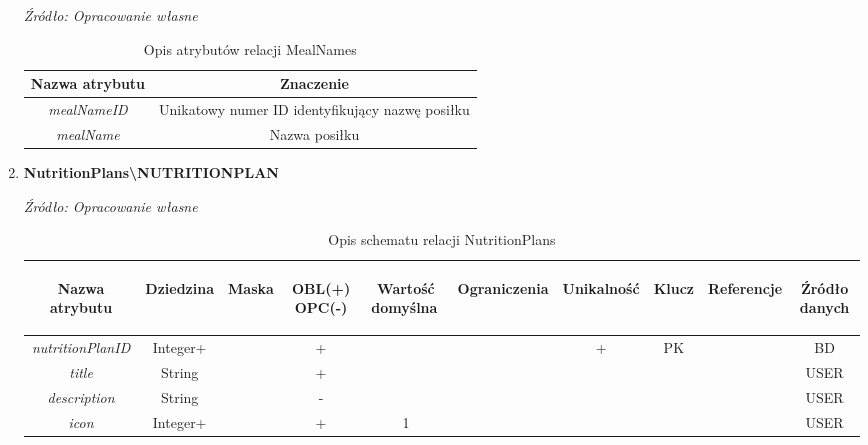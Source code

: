 \documentclass[12pt,twoside]{report}
\begin{document}
\begin{enumerate}[start=10,label={\bfseries REL\textbackslash\arabic*}]
	\begin{table}[H]
		\caption{Opis atrybutów relacji MealNames}
		\textit{Źródło: Opracowanie własne}
		\label{MealNamesAttributeDescription}
		\centering
		\begin{tabular}{|c|c|}
			\hline
			Nazwa atrybutu & Znaczenie \\			
			\hline			
			\textit{mealNameID}&Unikatowy numer ID identyfikujący nazwę posiłku\\	
			\hline			
			\textit{mealName}& Nazwa posiłku\\	
			\hline
		\end{tabular}
	\end{table}
	\item \textbf{NutritionPlans\textbackslash NUTRITIONPLAN} \begin{table}[H]
		\caption{Opis schematu relacji NutritionPlans}
		\textit{Źródło: Opracowanie własne}
		\label{NutritionPlansRelationSchema}
		\centering
		\begin{tabular}{|c|c|c|c|c|c|c|c|c|c|}
			\hline
			\begin{sideways}Nazwa atrybutu\end{sideways}& 
			\begin{sideways}Dziedzina \end{sideways}& 
			\begin{sideways}Maska \end{sideways}& 
			\begin{sideways}OBL(+) OPC(-)\end{sideways} & 
			\begin{sideways}Wartość domyślna$\ $\end{sideways}& 
			\begin{sideways}Ograniczenia\end{sideways} &
			\begin{sideways}Unikalność \end{sideways}& 
			\begin{sideways}Klucz \end{sideways}& 
			\begin{sideways}Referencje \end{sideways}&
			\begin{sideways}Źródło danych\end{sideways}\\
			\hline			
			\textit{nutritionPlanID}&Integer+&&+&&&+&PK&&BD\\	
			\hline			
			\textit{title}&String&&+&&&&&&USER\\	
			\hline			
			\textit{description}&String&&-&&&&&&USER\\	
			\hline			
			\textit{icon}&Integer+&&+&1&&&&&USER\\	
			\hline
		\end{tabular}
	\end{table}
	

\end{enumerate}
\end{document}
